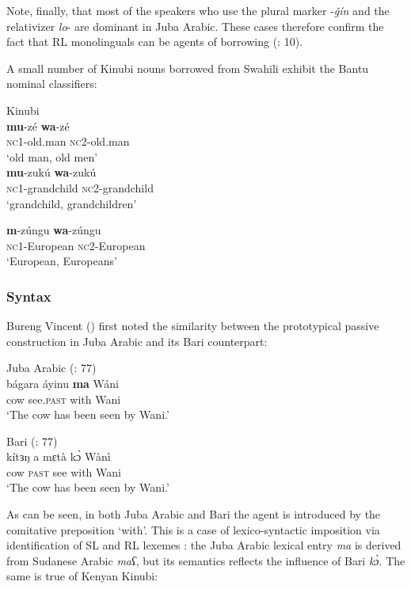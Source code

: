 \documentclass[output=paper]{langsci/langscibook}
\begin{document}
Note, finally, that most of the speakers who use the plural marker -\textit{ǧín} and the relativizer \textit{lo}{}- are dominant in Juba Arabic. These cases therefore confirm the fact that RL monolinguals can be agents of borrowing (\citealt{VanCoetsem1988}: 10).

A small number of Kinubi nouns borrowed from Swahili exhibit the Bantu nominal classifiers:

\ea

{Kinubi \citep[57]{Wellens2003}}\\
 
\ea\textbf{mu}-zé               \textbf{wa}-zé\\
 
{\textsc{nc}1-old.man   \textsc{nc2}-old.man}\\
 {`old man, old men'}\\
 
\ex
\gll  \textbf{mu}-zukú \textbf{wa}-zukú\\
          \textsc{nc}1-grandchild   \textsc{nc}2-grandchild\\
\glt       `grandchild, grandchildren'

\ex
\gll \textbf{m}-zúngu \textbf{wa}-zúngu\\
         \textsc{nc}1-European   \textsc{nc}2-European\\
\glt       `European, Europeans'
\z
\z

 \subsubsection{Syntax}

Bureng Vincent (\citeyear[77]{BurengVincent1986}) first noted the similarity between the prototypical passive construction in Juba Arabic and its Bari counterpart:


\ea
{Juba Arabic (\citealt{BurengVincent1986}: 77)}\\
\ea\gll  bágara áyinu \textbf{ma} Wáni\\
        cow see.\textsc{past} with Wani\\
\glt      `The cow has been seen by Wani.'

\ex
{Bari (\citealt{BurengVincent1986}: 77)}\\
\gll             kítɜŋ a mɛtà kɔ̀ Wànì\\
                 cow \textsc{past} see with Wani\\
\glt     `The cow has been seen by Wani.'
\z
\z

As can be seen, in both Juba Arabic and Bari the agent is introduced by the comitative preposition ‘with’. This is a case of lexico-syntactic imposition via identification of SL and RL lexemes \citep[415]{Manfredi2018}: the Juba Arabic lexical entry \textit{ma} is derived from Sudanese Arabic \textit{maʕ}, but its semantics reflects the influence of Bari \textit{kɔ̀}. The same is true of Kenyan Kinubi:
\end{document}
